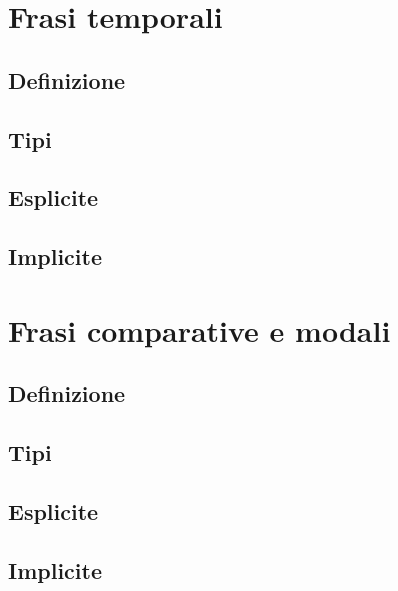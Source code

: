\documentclass[a4paper,twoside,11pt,chapterprefix=false,bibliography=totocnumbered,listof=flat]{scrbook}
\begin{document}
\hypertarget{frasi-temporali}{%
\chapter{Frasi temporali}\label{frasi-temporali}}

\hypertarget{definizione}{%
\section{Definizione}\label{definizione}}

\hypertarget{tipi-1}{%
\section{Tipi}\label{tipi-1}}

\hypertarget{esplicite-2}{%
\section{Esplicite}\label{esplicite-2}}

\hypertarget{implicite-2}{%
\section{Implicite}\label{implicite-2}}

\hypertarget{frasi-comparative-e-modali}{%
\chapter{Frasi comparative e modali}\label{frasi-comparative-e-modali}}

\hypertarget{definizione-1}{%
\section{Definizione}\label{definizione-1}}

\hypertarget{tipi-2}{%
\section{Tipi}\label{tipi-2}}

\hypertarget{esplicite-3}{%
\section{Esplicite}\label{esplicite-3}}

\hypertarget{implicite-3}{%
\section{Implicite}\label{implicite-3}}
\end{document}
